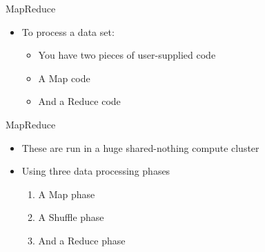 \documentclass[aspectratio=169]{beamer}
\begin{document}
\begin{frame}{MapReduce}

\begin{itemize}
\item To process a data set:
        \begin{itemize}
        \item You have two pieces of user-supplied code
	\item A Map code
	\item And a Reduce code
        \end{itemize}
\end{itemize}
\end{frame}
\begin{frame}{MapReduce}

\begin{itemize}
\item These are run in a huge shared-nothing compute cluster
        \item Using three data processing phases
        \begin{enumerate}
        \item A Map phase
        \item A Shuffle phase
        \item And a Reduce phase
        \end{enumerate}
\end{itemize}

\end{frame}
\end{document}
